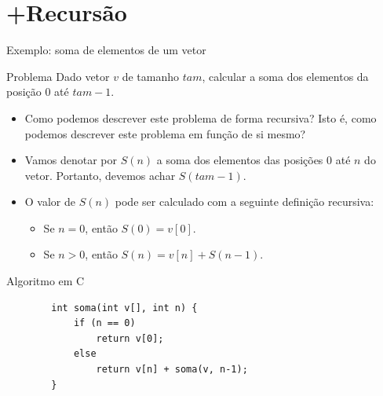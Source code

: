 \documentclass[handout]{beamer}
\begin{document}

\section{+Recursão}

\begin{frame}[fragile]{Exemplo: soma de elementos de um vetor}

    \begin{block}{Problema}
        Dado vetor $v$ de tamanho $tam$, calcular a soma dos elementos da posição 0 até $tam-1$.
    \end{block}

    \pause
    \begin{itemize}[<+->]
        \item Como podemos descrever este problema de forma recursiva? Isto é, como podemos descrever este problema em função de si mesmo?
        \item Vamos denotar por $S(n)$ a soma dos elementos das posições 0 até $n$ do vetor. Portanto, devemos achar $S(tam-1)$.
        \item O valor de $S(n)$ pode ser calculado com a seguinte definição recursiva:
        \begin{itemize}
            \item Se $n=0$, então $S(0) = v[0]$.
            \item Se $n>0$, então $S(n) = v[n] + S(n-1)$.
        \end{itemize}
    \end{itemize}

\end{frame}

\begin{frame}[fragile]{Algoritmo em C}

    \begin{verbatim}
        int soma(int v[], int n) {
            if (n == 0)
                return v[0];
            else
                return v[n] + soma(v, n-1);
        }
    \end{verbatim}

\end{frame}
\end{document}
